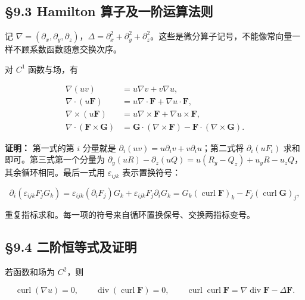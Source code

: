 \documentclass[11pt,a4paper]{article}
\begin{document}
\subsection{§9.3 Hamilton
算子及一阶运算法则}\label{hamilton-ux7b97ux5b50ux53caux4e00ux9636ux8fd0ux7b97ux6cd5ux5219}

记
\(\nabla=(\partial_x,\partial_y,\partial_z)\)，\(\Delta=\partial_x^2+\partial_y^2+\partial_z^2\)。这些是微分算子记号，不能像常向量一样不顾系数函数随意交换次序。

对 \(C^1\) 函数与场，有

\begin{equation*}
\begin{aligned}
 \nabla(uv)&=u\nabla v+v\nabla u,\\
 \nabla\cdot(u\mathbf F)&=u\nabla\cdot\mathbf F+\nabla u\cdot\mathbf F,\\
 \nabla\times(u\mathbf F)&=u\nabla\times\mathbf F+\nabla u\times\mathbf F,\\
 \nabla\cdot(\mathbf F\times\mathbf G)
 &=\mathbf G\cdot(\nabla\times\mathbf F)-\mathbf F\cdot(\nabla\times\mathbf G).
\end{aligned}\tag{9.3}
\end{equation*}

\textbf{证明：} 第一式的第 \(i\) 分量就是
\(\partial_i(uv)=u\partial_iv+v\partial_iu\)；第二式将
\(\partial_i(uF_i)\) 求和即可。第三式第一个分量为
\(\partial_y(uR)-\partial_z(uQ)=u(R_y-Q_z)+u_yR-u_zQ\)，其余循环相同。最后一式用
\(\varepsilon_{ijk}\) 表示置换符号：

\begin{equation*}
 \partial_i(\varepsilon_{ijk}F_jG_k)
 =\varepsilon_{ijk}(\partial_iF_j)G_k
   +\varepsilon_{ijk}F_j\partial_iG_k
 =G_k(\operatorname{curl}\mathbf F)_k-F_j(\operatorname{curl}\mathbf G)_j,
\end{equation*}

重复指标求和。每一项的符号来自循环置换保号、交换两指标变号。

\subsection{§9.4
二阶恒等式及证明}\label{ux4e8cux9636ux6052ux7b49ux5f0fux53caux8bc1ux660e}

若函数和场为 \(C^2\)，则

\begin{equation*}
 \operatorname{curl}(\nabla u)=0,\qquad
 \operatorname{div}(\operatorname{curl}\mathbf F)=0,\qquad
 \operatorname{curl}\operatorname{curl}\mathbf F
 =\nabla\operatorname{div}\mathbf F-\Delta\mathbf F.\tag{9.4}
\end{equation*}
\end{document}
